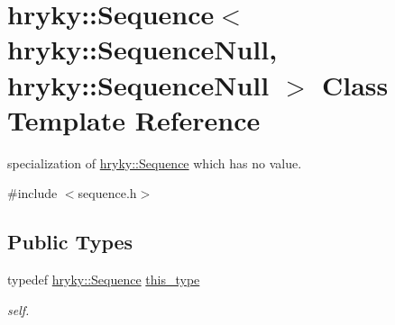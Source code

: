 \hypertarget{classhryky_1_1_sequence_3_01hryky_1_1_sequence_null_00_01hryky_1_1_sequence_null_01_4}{\section{hryky\-:\-:Sequence$<$ hryky\-:\-:Sequence\-Null, hryky\-:\-:Sequence\-Null $>$ Class Template Reference}
\label{classhryky_1_1_sequence_3_01hryky_1_1_sequence_null_00_01hryky_1_1_sequence_null_01_4}
}


specialization of \hyperlink{classhryky_1_1_sequence}{hryky\-::\-Sequence} which has no value.  




{\ttfamily \#include $<$sequence.\-h$>$}

\subsection*{Public Types}
\begin{DoxyCompactItemize}
\item 
\hypertarget{classhryky_1_1_sequence_3_01hryky_1_1_sequence_null_00_01hryky_1_1_sequence_null_01_4_a926e6902cf234e6b1d46c68ef472493f}{typedef \hyperlink{classhryky_1_1_sequence}{hryky\-::\-Sequence} \hyperlink{classhryky_1_1_sequence_3_01hryky_1_1_sequence_null_00_01hryky_1_1_sequence_null_01_4_a926e6902cf234e6b1d46c68ef472493f}{this\-\_\-type}}\label{classhryky_1_1_sequence_3_01hryky_1_1_sequence_null_00_01hryky_1_1_sequence_null_01_4_a926e6902cf234e6b1d46c68ef472493f}

\begin{DoxyCompactList}\small\item\em self. \end{DoxyCompactList}\end{DoxyCompactItemize}
